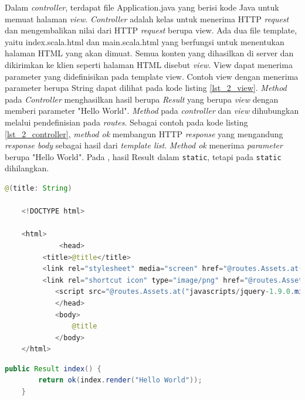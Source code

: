 Dalam \textit{controller}, terdapat file Application.java yang berisi kode Java untuk memuat halaman \textit{view}. \textit{Controller} adalah kelas untuk menerima HTTP \textit{request} dan mengembalikan nilai dari HTTP \textit{request} berupa view. Ada dua file template, yaitu index.scala.html dan main.scala.html yang berfungsi untuk menentukan halaman HTML yang akan dimuat. Semua konten yang dihasilkan di server dan dikirimkan ke klien seperti halaman HTML disebut \textit{view}. View dapat menerima parameter yang didefinisikan pada template view. Contoh view dengan menerima parameter berupa String dapat dilihat pada kode listing \ref{lst_2_view}. \textit{Method} pada \textit{Controller} menghasilkan hasil berupa \textit{Result} yang berupa \textit{view} dengan memberi parameter "Hello World". \textit{Method} pada \textit{controller} dan \textit{view} dihubungkan melalui pendefinisian pada \textit{routes}. Sebagai contoh pada kode listing \ref{lst_2_controller}, \textit{method ok} membangun HTTP \textit{response} yang mengandung \textit{response body} sebagai hasil dari \textit{template list}. \textit{Method ok} menerima \textit{parameter} berupa "Hello World". Pada \cite{playforjava}, hasil Result dalam \verb!static!, tetapi pada  \verb!static! dihilangkan.

\begin{lstlisting}[caption=Contoh View,label = {lst_2_view},language=Java]
@(title: String)

	<!DOCTYPE html>

	<html>
    		 <head>
       	 <title>@title</title>
       	 <link rel="stylesheet" media="screen" href="@routes.Assets.at("stylesheets/main.css")">
       	 <link rel="shortcut icon" type="image/png" href="@routes.Assets.at("images/favicon.png")">
        	<script src="@routes.Assets.at("javascripts/jquery-1.9.0.min.js")" type="text/javascript"></script>
    		</head>
    		<body>
        		@title
    		</body>
	</html>
\end{lstlisting}


\begin{lstlisting}[caption=Contoh Controller,label = {lst_2_controller},language=Java]
	public Result index() {
        return ok(index.render("Hello World"));
    }
\end{lstlisting}

